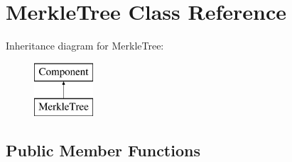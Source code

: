 \hypertarget{classMerkleTree}{}\section{Merkle\+Tree Class Reference}
\label{classMerkleTree}
Inheritance diagram for Merkle\+Tree\+:\begin{figure}[H]
\begin{center}
\leavevmode
\includegraphics[height=2.000000cm]{classMerkleTree}
\end{center}
\end{figure}
\subsection*{Public Member Functions}
